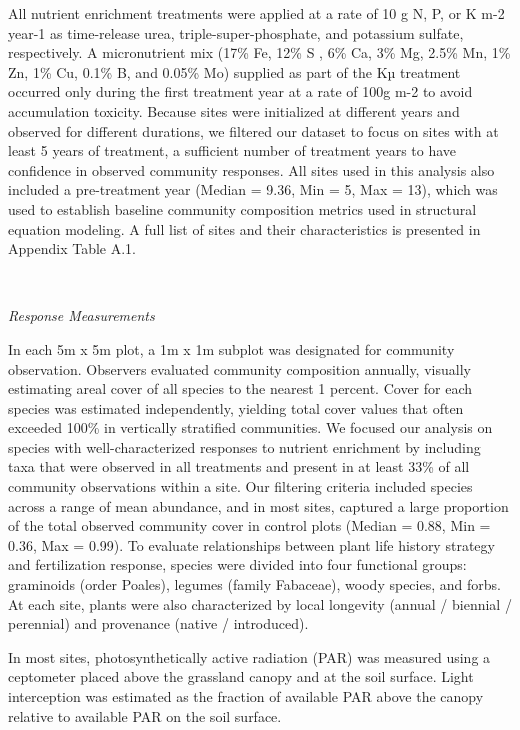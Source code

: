 \documentclass[twoside,12pt,final]{ucthesis-CA2012}
\begin{document}
\begin{ucmainmatter}
All nutrient enrichment treatments were applied at a rate of 10 g N, P, or K m-2 year-1 as time-release urea, triple-super-phosphate, and potassium sulfate, respectively. A micronutrient mix (17\% Fe, 12\% S , 6\% Ca, 3\% Mg, 2.5\% Mn, 1\% Zn, 1\% Cu, 0.1\% B, and 0.05\% Mo) supplied as part of the Kµ treatment occurred only during the first treatment year at a rate of 100g m-2 to avoid accumulation toxicity.
Because sites were initialized at different years and observed for different durations, we filtered our dataset to focus on sites with at least 5 years of treatment, a sufficient number of treatment years to have confidence in observed community responses. All sites used in this analysis also included a pre-treatment year (Median = 9.36, Min = 5, Max = 13), which was used to establish baseline community composition metrics used in structural equation modeling. A full list of sites and their characteristics is presented in Appendix Table A.1.

~

\emph{Response Measurements}

In each 5m x 5m plot, a 1m x 1m subplot was designated for community observation. Observers evaluated community composition annually, visually estimating areal cover of all species to the nearest 1 percent. Cover for each species was estimated independently, yielding total cover values that often exceeded 100\% in vertically stratified communities. We focused our analysis on species with well-characterized responses to nutrient enrichment by including taxa that were observed in all treatments and present in at least 33\% of all community observations within a site. Our filtering criteria included species across a range of mean abundance, and in most sites, captured a large proportion of the total observed community cover in control plots (Median = 0.88, Min = 0.36, Max = 0.99).
To evaluate relationships between plant life history strategy and fertilization response, species were divided into four functional groups: graminoids (order Poales), legumes (family Fabaceae), woody species, and forbs. At each site, plants were also characterized by local longevity (annual / biennial / perennial) and provenance (native / introduced).

In most sites, photosynthetically active radiation (PAR) was measured using a ceptometer placed above the grassland canopy and at the soil surface. Light interception was estimated as the fraction of available PAR above the canopy relative to available PAR on the soil surface.


\end{ucmainmatter}
\end{document}
